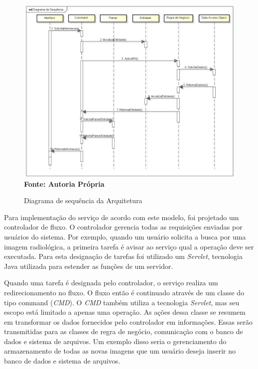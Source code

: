 \begin{figure}[ht]
	\centering	
	\caption[\hspace{0.1cm}Diagrama de Sequência.]{Diagrama de sequência da Arquitetura}
	\vspace{-0.4cm}
	\includegraphics[width=1.0\textwidth]{figuras/diagramas/sequencia.png}
	\vspace{-0.2cm}
	\\\textbf{\footnotesize Fonte: Autoria Própria }
	\label{fig:figura2}
\end{figure}

Para implementação do serviço de acordo com este modelo, foi projetado um controlador de fluxo.
O controlador gerencia todas as requisições enviadas por usuários do sistema.
Por exemplo, quando um usuário solicita a busca por uma imagem radiológica, a primeira tarefa é avisar ao serviço qual a operação deve ser executada.
Para esta designação de tarefas foi utilizado um \textit{Servlet}, tecnologia Java utilizada para estender as funções de um servidor.

Quando uma tarefa é designada pelo controlador, o serviço realiza um redirecionamento no fluxo.
O fluxo então é continuado através de um classe do tipo command (\textit{CMD}).
O \textit{CMD} também utiliza a tecnologia \textit{Servlet}, mas seu escopo está limitado a apenas uma operação.
As ações dessa classe se resumem em transformar os dados fornecidos pelo controlador em informações.
Essas serão transmitidas para as classes de regra de negócio, comunicação com o banco de dados e sistema de arquivos.
Um exemplo disso seria o gerenciamento do armazenamento de todas as novas imagens que um usuário deseja inserir no banco de dados e sistema de arquivos.

